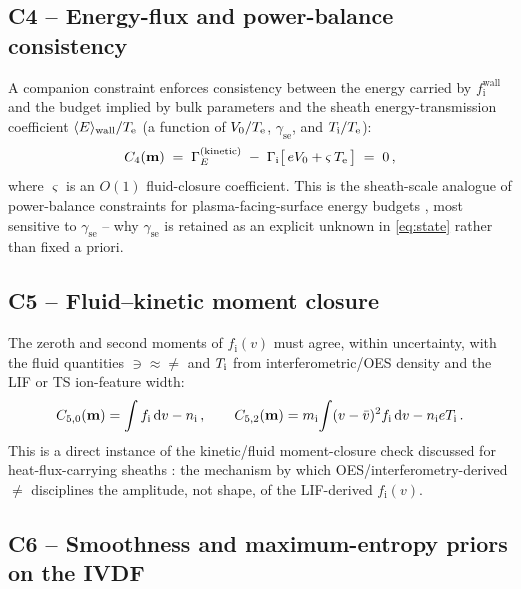 \subsection{C4 -- Energy-flux and power-balance consistency}

A companion constraint enforces consistency between the energy carried by $f_{\mathrm i}^{\mathrm{wall}}$ and the budget implied by bulk parameters and the sheath energy-transmission coefficient $\langle E\rangle_{\mathrm{wall}}/T_{\mathrm{e}}$ (a function of $V_{0}/T_{\mathrm{e}}$, $\gamma_{\mathrm{se}}$, and $T_{\mathrm{i}}/T_{\mathrm{e}}$):
\begin{equation}
C_{4}(\mathbf m) \;=\; \Gamma_{E}^{\mathrm{(kinetic)}} \;-\; \Gamma_{\mathrm i}\big[\,e V_{0} + \varsigma\,T_{\mathrm{e}}\, \big] \;=\; 0 \, , \label{eq:C4}
\end{equation}
where $\varsigma$ is an $O(1)$ fluid-closure coefficient. This is the sheath-scale analogue of power-balance constraints for plasma-facing-surface energy budgets \cite{ref0093,ref0080}, most sensitive to $\gamma_{\mathrm{se}}$ -- why $\gamma_{\mathrm{se}}$ is retained as an explicit unknown in \cref{eq:state} rather than fixed a priori.

\subsection{C5 -- Fluid--kinetic moment closure}

The zeroth and second moments of $f_{\mathrm i}(v)$ must agree, within uncertainty, with the fluid quantities $\ni\approx\ne$ and $T_{\mathrm{i}}$ from interferometric/OES density and the LIF or TS ion-feature width:
\begin{equation}
C_{5,0}(\mathbf m) = \int f_{\mathrm i}\,\mathrm dv - n_{\mathrm{i}}\, ,\qquad C_{5,2}(\mathbf m) = m_{\mathrm i}\!\int (v-\bar v)^{2} f_{\mathrm i}\,\mathrm dv - n_{\mathrm{i}} eT_{\mathrm{i}} \, . \label{eq:C5}
\end{equation}
This is a direct instance of the kinetic/fluid moment-closure check discussed for heat-flux-carrying sheaths \cite{ref0101}: the mechanism by which OES/interferometry-derived $\ne$ disciplines the amplitude, not shape, of the LIF-derived $f_{\mathrm i}(v)$.

\subsection{C6 -- Smoothness and maximum-entropy priors on the IVDF}

